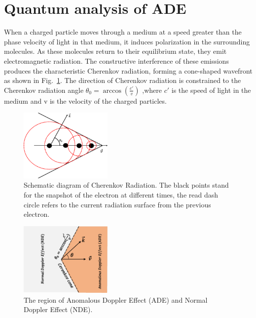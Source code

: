 \documentclass{cpbtex3}
\begin{document}
\section{Quantum analysis of ADE}\label{Quantum}

When a charged particle moves through a medium at a speed greater than the phase velocity of light in that medium, it induces polarization in the surrounding molecules. As these molecules return to their equilibrium state, they emit electromagnetic radiation. The constructive interference of these emissions produces the characteristic Cherenkov radiation, forming a cone-shaped wavefront as shown in Fig.~\ref{fig:cherenkov}. The direction of Cherenkov radiation is constrained to the Cherenkov radiation angle $\theta_0 = \arccos\left(\frac{c'}{v}\right)$
,where $ c'$ is the speed of light in the medium and v is the velocity of the charged particles.
\begin{figure}[ht]
\centering
\includegraphics[width=0.4\textwidth]{Figure1.eps}%
\caption{\label{fig:cherenkov}Schematic diagram of Cherenkov Radiation. The black points stand for the snapshot of the electron at different times, the read dash circle refers to the current radiation surface from the previous electron.}
\end{figure}
\begin{figure}
\centering
\includegraphics[width=0.4\textwidth]{Figure2.eps}%
\caption{\label{fig:ADENDE}The region of Anomalous Doppler Effect (ADE) and Normal Doppler Effect (NDE).}
\end{figure}
\end{document}
